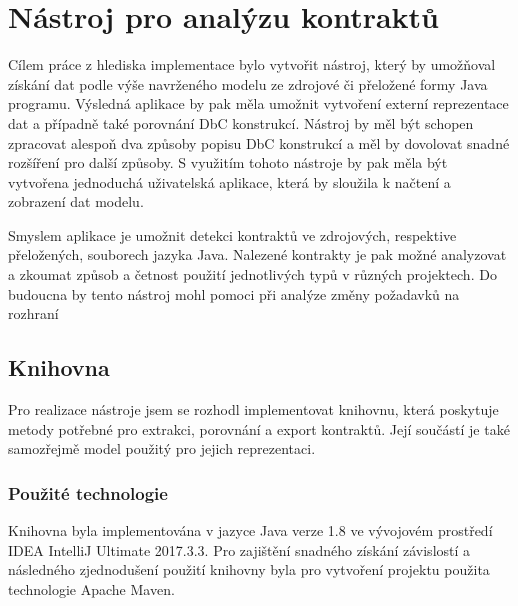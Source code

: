 \chapter{Nástroj pro analýzu kontraktů}
	Cílem práce z hlediska implementace bylo vytvořit nástroj, který by umožňoval získání dat podle výše navrženého modelu ze zdrojové či přeložené formy Java programu. Výsledná aplikace by pak měla umožnit vytvoření externí reprezentace dat a případně také porovnání DbC konstrukcí. Nástroj by měl být schopen zpracovat alespoň dva způsoby popisu DbC konstrukcí a měl by dovolovat snadné rozšíření pro další způsoby. S využitím tohoto nástroje by pak měla být vytvořena jednoduchá uživatelská aplikace, která by sloužila k načtení a zobrazení dat modelu.
	
	Smyslem aplikace je umožnit detekci kontraktů ve zdrojových, respektive přeložených, souborech jazyka Java. Nalezené kontrakty je pak možné analyzovat a zkoumat způsob a četnost použití jednotlivých typů v různých projektech. Do budoucna by tento nástroj mohl pomoci při analýze změny požadavků na rozhraní 
	
	
	
	\section{Knihovna}
		Pro realizace nástroje jsem se rozhodl implementovat knihovnu, která poskytuje metody potřebné pro extrakci, porovnání a export kontraktů. Její součástí je také samozřejmě model použitý pro jejich reprezentaci. 

	    \subsection{Použité technologie}
			Knihovna byla implementována v jazyce Java verze 1.8 ve vývojovém prostředí IDEA IntelliJ Ultimate 2017.3.3. Pro zajištění snadného získání závislostí a následného zjednodušení použití knihovny byla pro vytvoření projektu použita technologie Apache Maven.


